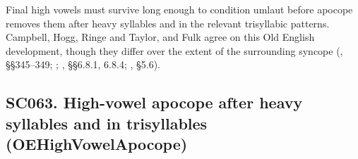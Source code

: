 \documentclass[
  british,
  a4paper,
  openany]{book}
\providecommand{\texorpdfstring}[2]{#1}
\DeclareRobustCommand{\CAPRRuleHeading}[2]{%
  #1\texorpdfstring{\\(#2)}{ (#2)}%
}
\begin{document}
Final high vowels must survive long enough to condition umlaut before
apocope removes them after heavy syllables and in the relevant
trisyllabic patterns. Campbell, Hogg, Ringe and Taylor, and Fulk agree
on this Old English development, though they differ over the extent of
the surrounding syncope (, §§345--349; ;
,
§§6.8.1, 6.8.4; , §5.6).

\subsection{\texorpdfstring{\CAPRRuleHeading{SC063. High-vowel apocope after heavy syllables and in trisyllables}{OEHighVowelApocope}}{}}\label{rule-OEHighVowelApocope}
\end{document}
